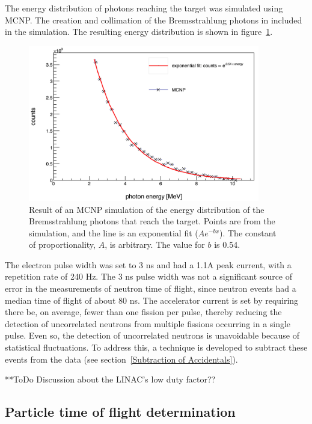 The energy distribution of photons reaching the target was simulated using MCNP.
The creation and collimation of the Bremsstrahlung photons in included in the simulation.
The resulting energy distribution is shown in figure~\ref{fig:BremDist}.

\begin{figure}[h]
\includegraphics[width=0.9\textwidth]{Content/Methods/MCNPBremDistribution.png}
\caption{Result of an MCNP simulation of the energy distribution of the Bremsstrahlung photons that reach the target. Points are from the simulation, and the line is an exponential fit ($Ae^{-bx}$). The constant of proportionality, $A$, is arbitrary. The value for $b$ is 0.54.}
\label{fig:BremDist}
\end{figure}

The electron pulse width was set to 3 ns and had a 1.1A peak current, with a repetition rate of 240 Hz.
The 3 ns pulse width was not a significant source of error in the measurements of neutron time of flight, since neutron events had a median time of flight of about 80 ns.
The accelerator current is set by requiring there be, on average, fewer than one fission per pulse, thereby reducing the detection of uncorrelated neutrons from multiple fissions occurring in a single pulse.
Even so, the detection of uncorrelated neutrons is unavoidable because of statistical fluctuations.
To address this, a technique is developed to subtract these events from the data (see section~\ref{Subtraction of Accidentals}).

**ToDo Discussion about the LINAC's low duty factor??

\subsection{Particle time of flight determination}
\label{reconstruction}

